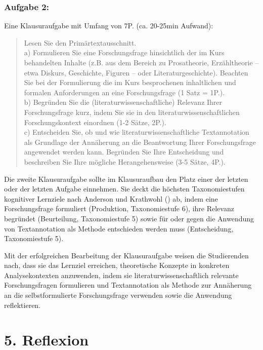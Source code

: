 \documentclass[
          a4paper,
        ]{article}
\begin{document}
\subsubsection{Aufgabe 2:}\label{aufgabe-2}

Eine Klausuraufgabe mit Umfang von 7P. (ca. 20-25min Aufwand):

\begin{quote}
Lesen Sie den Primärtextausschnitt.\\
a) Formulieren Sie eine Forschungsfrage hinsichtlich der im Kurs
behandelten Inhalte (z.B. aus dem Bereich zu Prosatheorie, Erzähltheorie
-- etwa Diskurs, Geschichte, Figuren -- oder Literaturgeschichte).
Beachten Sie bei der Formulierung die im Kurs besprochenen inhaltlichen
und formalen Anforderungen an eine Forschungsfrage (1 Satz = 1P.).\\
b) Begründen Sie die (literaturwissenschaftliche) Relevanz Ihrer
Forschungsfrage kurz, indem Sie sie in den literaturwissenschaftlichen
Forschungskontext einordnen (1-2 Sätze, 2P.).\\
c) Entscheiden Sie, ob und wie literaturwissenschaftliche Textannotation
als Grundlage der Annäherung an die Beantwortung Ihrer Forschungsfrage
angewendet werden kann. Begründen Sie Ihre Entscheidung und beschreiben
Sie Ihre mögliche Herangehensweise (3-5 Sätze, 4P.).
\end{quote}

Die zweite Klausuraufgabe sollte im Klausuraufbau den Platz einer der
letzten oder der letzten Aufgabe einnehmen. Sie deckt die höchsten
Taxonomiestufen kognitiver Lernziele nach Anderson und Krathwohl
() ab, indem eine
Forschungsfrage formuliert (Produktion, Taxonomiestufe 6), ihre Relevanz
begründet (Beurteilung, Taxonomiestufe 5) sowie für oder gegen die
Anwendung von Textannotation als Methode entschieden werden muss
(Entscheidung, Taxonomiestufe 5).

Mit der erfolgreichen Bearbeitung der Klausuraufgabe weisen die
Studierenden nach, dass sie das Lernziel erreichen, theoretische
Konzepte in konkreten Analysekontexten anzuwenden, indem sie
literaturwissenschaftlich relevante Forschungsfragen formulieren und
Textannotation als Methode zur Annäherung an die selbstformulierte
Forschungsfrage verwenden sowie die Anwendung reflektieren.

\section{5. Reflexion}\label{reflexion}
\end{document}
